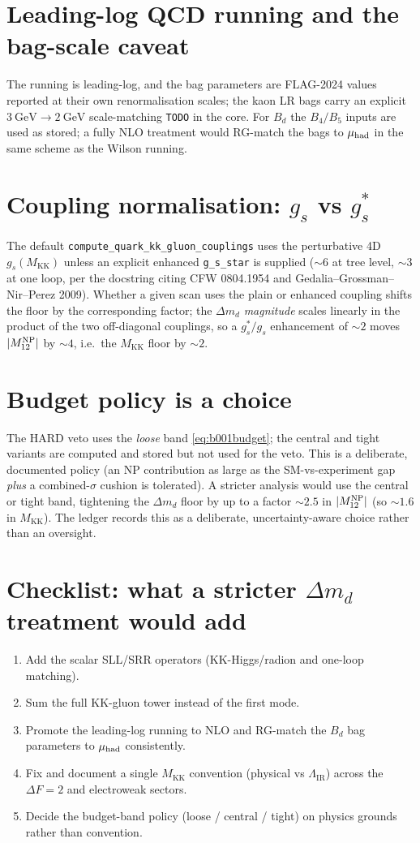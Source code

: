 \documentclass[11pt]{article}
\newcommand{\MKK}{M_{\mathrm{KK}}}
\newcommand{\LIR}{\Lambda_{\mathrm{IR}}}
\newcommand{\Mtwelve}{M_{12}}
\newcommand{\dmd}{\Delta m_d}
\newcommand{\code}[1]{\texttt{#1}}
\theoremstyle{definition}
\begin{document}
\section{Leading-log QCD running and the bag-scale caveat}
The running is leading-log, and the bag parameters are FLAG-2024 values reported
at their own renormalisation scales; the kaon LR bags carry an explicit
$3~\text{GeV}\!\to\!2~\text{GeV}$ scale-matching \code{TODO} in the core. For
$B_d$ the $B_4/B_5$ inputs are used as stored; a fully NLO treatment would
RG-match the bags to $\mu_{\rm had}$ in the same scheme as the Wilson running.

\section{Coupling normalisation: $g_s$ vs $g_s^*$}
The default \code{compute\_quark\_kk\_gluon\_couplings} uses the perturbative
4D $g_s(\MKK)$ unless an explicit enhanced \code{g\_s\_star} is supplied
($\sim6$ at tree level, $\sim3$ at one loop, per the docstring citing CFW
0804.1954 and Gedalia--Grossman--Nir--Perez 2009). Whether a given scan uses the
plain or enhanced coupling shifts the floor by the corresponding factor; the
$\dmd$ \emph{magnitude} scales linearly in the product of the two off-diagonal
couplings, so a $g_s^*/g_s$ enhancement of $\sim2$ moves $|\Mtwelve^{\rm NP}|$ by
$\sim4$, i.e.\ the $\MKK$ floor by $\sim2$.

\section{Budget policy is a choice}
The HARD veto uses the \emph{loose} band \eqref{eq:b001budget}; the central and
tight variants are computed and stored but not used for the veto. This is a
deliberate, documented policy (an NP contribution as large as the
SM-vs-experiment gap \emph{plus} a combined-$\sigma$ cushion is tolerated). A
stricter analysis would use the central or tight band, tightening the $\dmd$
floor by up to a factor $\sim2.5$ in $|\Mtwelve^{\rm NP}|$ (so $\sim1.6$ in
$\MKK$). The ledger records this as a deliberate, uncertainty-aware choice rather
than an oversight.

\section{Checklist: what a stricter $\dmd$ treatment would add}
\begin{enumerate}[leftmargin=1.8em]
\item Add the scalar SLL/SRR operators (KK-Higgs/radion and one-loop matching).
\item Sum the full KK-gluon tower instead of the first mode.
\item Promote the leading-log running to NLO and RG-match the $B_d$ bag
parameters to $\mu_{\rm had}$ consistently.
\item Fix and document a single $\MKK$ convention (physical vs $\LIR$) across the
$\Delta F=2$ and electroweak sectors.
\item Decide the budget-band policy (loose / central / tight) on physics grounds
rather than convention.
\end{enumerate}
\end{document}
